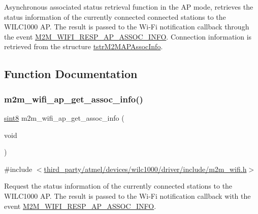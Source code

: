 Asynchronous associated status retrieval function in the AP mode, retrieves the status information of the currently connected connected stations to the W\+I\+L\+C1000 AP. The result is passed to the Wi-\/\+Fi notification callback through the event \hyperlink{group__WlanEnums_ggaa62989ea5e2977b374a04db81c89d524ae44909b7e419ce7c69f64ab8399ea67d}{M2\+M\+\_\+\+W\+I\+F\+I\+\_\+\+R\+E\+S\+P\+\_\+\+A\+P\+\_\+\+A\+S\+S\+O\+C\+\_\+\+I\+N\+FO}. Connection information is retrieved from the structure \hyperlink{structtstrM2MAPAssocInfo}{tstr\+M2\+M\+A\+P\+Assoc\+Info}. 

\subsection{Function Documentation}
\mbox{\label{group__GetConnectionInfoFn_ga567fc3927ab3a93e232cc3e4c29c673b}} 
\subsubsection{\texorpdfstring{m2m\+\_\+wifi\+\_\+ap\+\_\+get\+\_\+assoc\+\_\+info()}{m2m\_wifi\_ap\_get\_assoc\_info()}}
{\footnotesize\ttfamily \hyperlink{group__DataT_gae35f10ffd0ac8dd2bc3e794da9bdfbc7}{sint8} m2m\+\_\+wifi\+\_\+ap\+\_\+get\+\_\+assoc\+\_\+info (\begin{DoxyParamCaption}\item[{void}]{ }\end{DoxyParamCaption})}



{\ttfamily \#include $<$\hyperlink{m2m__wifi_8h}{third\+\_\+party/atmel/devices/wilc1000/driver/include/m2m\+\_\+wifi.\+h}$>$}



Request the status information of the currently connected stations to the W\+I\+L\+C1000 AP. The result is passed to the Wi-\/\+Fi notification callback with the event \hyperlink{group__WlanEnums_ggaa62989ea5e2977b374a04db81c89d524ae44909b7e419ce7c69f64ab8399ea67d}{M2\+M\+\_\+\+W\+I\+F\+I\+\_\+\+R\+E\+S\+P\+\_\+\+A\+P\+\_\+\+A\+S\+S\+O\+C\+\_\+\+I\+N\+FO}. 

